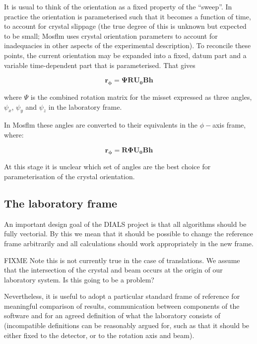 \documentclass[a4paper, 11pt]{article}
\renewcommand{\vec}[1]{\mathbf{#1}}
\begin{document}
It is usual to think of the orientation as a fixed property of the ``sweep''.
In practice the orientation is parameterised such that it becomes a function
of time, to account for crystal slippage (the true degree of this is unknown but
expected to be small; Mosflm uses crystal orientation parameters to account for
inadequacies in other aspects of the experimental description). To reconcile
these points, the current orientation may be expanded into a fixed, datum part
and a variable time-dependent part that is parameterised. That gives

\begin{equation}
\vec{r_\phi} = \mathbf{\Psi}\mathbf{R}\mathbf{U_0}\mathbf{B}\vec{h}
\end{equation}

where $\Psi$ is the combined rotation matrix for the misset expressed as
three angles, $\psi_x$, $\psi_y$ and $\psi_z$ in the laboratory frame.

In Mosflm these angles are converted to their equivalents in the $\phi-$axis 
frame, where:

\begin{equation}
\vec{r_\phi} = \mathbf{R}\mathbf{\Phi}\mathbf{U_0}\mathbf{B}\vec{h}
\end{equation}

At this stage it is unclear which set of angles are the best choice for
parameterisation of the crystal orientation.

\subsection{The laboratory frame}

An important design goal of the DIALS project is that all algorithms should be
fully vectorial. By this we mean that it should be possible to change the
reference frame arbitrarily and all calculations should work appropriately in
the new frame.

FIXME Note this is not currently true in the case of translations. We assume that
the intersection of the crystal and beam occurs at the origin of our laboratory
system. Is this going to be a problem?

Nevertheless, it is useful to adopt a particular standard frame of reference for
meaningful comparison of results, communication between components of the
software and for an agreed definition of what the laboratory consists of
(incompatible definitions can be reasonably argued for, such as that it should
be either fixed to the detector, or to the rotation axis and beam).
\end{document}
